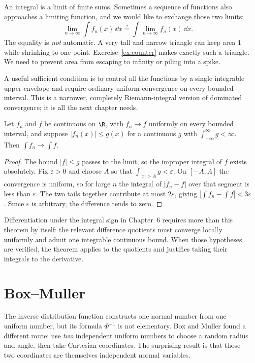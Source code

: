 An integral is a limit of finite sums. Sometimes a sequence of functions also approaches a limiting function, and we would like to exchange those two limits:
\[
 \lim_{n\to\infty}\int f_n(x)\,\dd x
 \stackrel{?}{=}\int\lim_{n\to\infty} f_n(x)\,\dd x.
\]
The equality is \emph{not} automatic. A very tall and narrow triangle can keep area $1$ while shrinking to one point. Exercise~\ref{ex:counter} makes exactly such a triangle. We need to prevent area from escaping to infinity or piling into a spike.

A useful sufficient condition is to control all the functions by a single integrable upper envelope and require ordinary uniform convergence on every bounded interval. This is a narrower, completely Riemann-integral version of dominated convergence; it is all the next chapter needs.

\begin{theorem}\label{thm:dct}
Let $f_n$ and $f$ be continuous on $\R$, with $f_n\to f$ uniformly on every bounded interval, and suppose $|f_n(x)|\le g(x)$ for a continuous $g$ with $\int_{-\infty}^{\infty}g<\infty$. Then $\int f_n\to\int f$.
\end{theorem}
\begin{proof}
The bound $|f|\le g$ passes to the limit, so the improper integral of $f$ exists absolutely. Fix $\varepsilon>0$ and choose $A$ so that $\int_{|x|>A}g<\varepsilon$. On $[-A,A]$ the convergence is uniform, so for large $n$ the integral of $|f_n-f|$ over that segment is less than $\varepsilon$. The two tails together contribute at most $2\varepsilon$, giving $|\int f_n-\int f|<3\varepsilon$. Since $\varepsilon$ is arbitrary, the difference tends to zero.
\end{proof}

Differentiation under the integral sign in Chapter~6 requires more than this theorem by itself: the relevant difference quotients must converge locally uniformly and admit one integrable continuous bound. When those hypotheses are verified, the theorem applies to the quotients and justifies taking their integrals to the derivative.

\section{Box--Muller}

The inverse distribution function constructs one normal number from one uniform number, but its formula $\Phi^{-1}$ is not elementary. Box and Muller found a different route: use \emph{two} independent uniform numbers to choose a random radius and angle, then take Cartesian coordinates. The surprising result is that those two coordinates are themselves independent normal variables.

